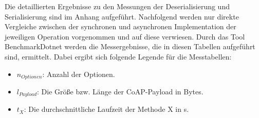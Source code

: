 Die detaillierten Ergebnisse zu den Messungen der Deserialisierung und Serialisierung sind im Anhang aufgeführt. Nachfolgend werden nur direkte Vergleiche zwischen der synchronen und asynchronen Implementation der jeweiligen Operation vorgenommen und auf diese verwiesen. Durch das Tool BenchmarkDotnet werden die Messergebnisse, die in diesen Tabellen aufgeführt sind, ermittelt. Dabei ergibt sich folgende Legende für die Messtabellen:
\begin{itemize}
    \item $n_{Optionen}$: Anzahl der Optionen.
    \item $l_{Payload}$: Die Größe bzw. Länge der CoAP-Payload in Bytes.
    \item $t_{X}$: Die durchschnittliche Laufzeit der Methode X in \mu s.
\end{itemize}


